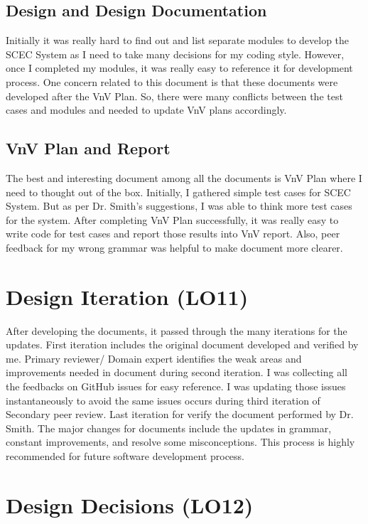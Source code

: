 \documentclass{article}
\begin{document}
\subsection{Design and Design Documentation}

Initially it was really hard to find out and list separate modules to develop the SCEC System as I need to take many decisions for my coding style. However, once I completed my modules, it was really easy to reference it for development process. One concern related to this document is that these documents were developed after the VnV Plan. So, there were many conflicts between the test cases and modules and needed to update VnV plans accordingly.  

\subsection{VnV Plan and Report}

The best and interesting document among all the documents is VnV Plan where I need to thought out of the box. Initially, I gathered simple test cases for SCEC System. But as per Dr. Smith's suggestions, I was able to think more test cases for the system. After completing VnV Plan successfully, it was really easy to write code for test cases and report those results into VnV report. Also, peer feedback for my wrong grammar was helpful to make document more clearer.  

\section{Design Iteration (LO11)}

After developing the documents, it passed through the many iterations for the updates. First iteration includes the original document developed and verified by me. Primary reviewer/ Domain expert identifies the weak areas and improvements needed in document during second iteration. I was collecting all the feedbacks on GitHub issues for easy reference. I was updating those issues instantaneously to avoid the same issues occurs during third iteration of Secondary peer review. Last iteration for verify the document performed by Dr. Smith. The major changes for documents include the updates in grammar, constant improvements, and resolve some misconceptions. This process is highly recommended for future software development process.        

\section{Design Decisions (LO12)}
\end{document}
